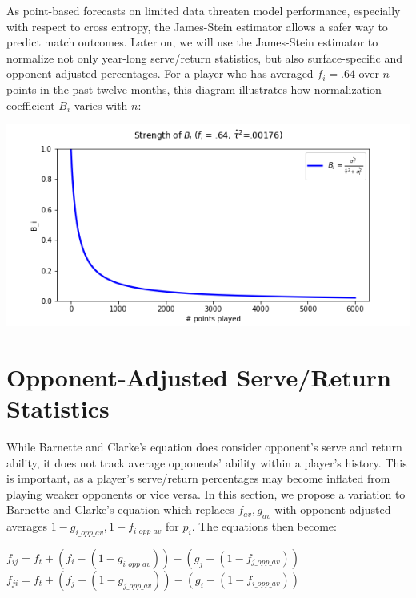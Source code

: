 \documentclass[chapterprefix=false]{report}
\begin{document}
As point-based forecasts on limited data threaten model performance, especially with respect to cross entropy, the James-Stein estimator allows a safer way to predict match outcomes. Later on, we will use the James-Stein estimator to normalize not only year-long serve/return statistics, but also surface-specific and opponent-adjusted percentages. For a player who has averaged $f_i=.64$ over $n$ points in the past twelve months, this diagram illustrates how normalization coefficient $B_i$ varies with $n$:

\includegraphics[scale=.7]{norm_fig}



\section{Opponent-Adjusted Serve/Return Statistics}

While Barnette and Clarke's equation does consider opponent's serve and return ability, it does not track average opponents' ability within a player's history. This is important, as a player's serve/return percentages may become inflated from playing weaker opponents or vice versa. In this section, we propose a variation to Barnette and Clarke's equation which replaces $f_{av},g_{av}$ with opponent-adjusted averages $1-g_{i\_opp\_av},1-f_{i\_opp\_av}$ for $p_i$. The equations then become:

\begin{center}
$f_{ij} = f_t + (f_i-(1-g_{i\_opp\_av}))-(g_j-(1-f_{j\_opp\_av}))$
$f_{ji} = f_t + (f_j-(1-g_{j\_opp\_av}))-(g_i-(1-f_{i\_opp\_av}))$
\end{center}
\end{document}
